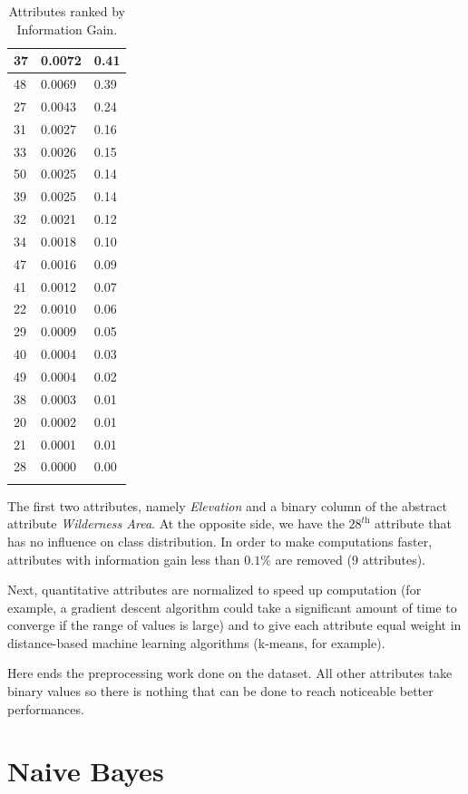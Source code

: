 \documentclass[a4paper, 10pt]{article}
\begin{document}
\begin{longtable}{|l|l|l|}
37 &  0.0072 &  0.41 \\\hline
48 &  0.0069 &  0.39 \\\hline
27 &  0.0043 &  0.24 \\\hline
31 &  0.0027 &  0.16 \\\hline
33 &  0.0026 &  0.15 \\\hline
50 &  0.0025 &  0.14 \\\hline
39 &  0.0025 &  0.14 \\\hline
32 &  0.0021 &  0.12 \\\hline
34 &  0.0018 &  0.10 \\\hline
47 &  0.0016 &  0.09 \\\hline
41 &  0.0012 &  0.07 \\\hline
22 &  0.0010 &  0.06 \\\hline
29 &  0.0009 &  0.05 \\\hline
40 &  0.0004 &  0.03 \\\hline
49 &  0.0004 &  0.02 \\\hline
38 &  0.0003 &  0.01 \\\hline
20 &  0.0002 &  0.01 \\\hline
21 &  0.0001 &  0.01 \\\hline
28 &  0.0000 &  0.00 \\\hline
\caption{Attributes ranked by Information Gain.}
\label{tab:infogain}
\end{longtable}

The first two attributes, namely \emph{Elevation} and a binary column of the abstract attribute \emph{Wilderness Area}. At the opposite side, we have the $28^{\textit{th}}$ attribute that has no influence on class distribution. In order to make computations faster, attributes with information gain less than $0.1\%$ are removed (9 attributes).

Next, quantitative attributes are normalized to speed up computation (for example, a gradient descent algorithm could take a significant amount of time to converge if the range of values is large) and to give each attribute equal weight in distance-based machine learning algorithms (k-means, for example).

Here ends the preprocessing work done on the dataset. All other attributes take binary values so there is nothing that can be done to reach noticeable better performances.

\section{Naive Bayes}
\end{document}
